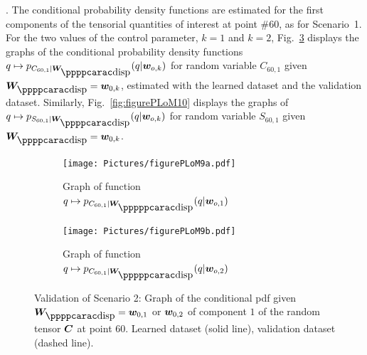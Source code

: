 .
%
The conditional probability density functions are estimated for the first components of the tensorial quantities of interest at point $\# 60$, as for Scenario~1.
%
For the two values of the control parameter, $k=1$ and $k=2$, Fig.~\ref{fig:figurePLoM9} displays the graphs of the conditional probability density functions $q\mapsto p_{ C_{60,1} \vert \bfW_\dispp } (q \vert \bfw_{o,k})$ for random variable $C_{60,1}$ given $\bfW_\dispp =\bfw_{0,k}$, estimated with the learned dataset and the validation dataset. Similarly, Fig.~\ref{fig:figurePLoM10} displays the graphs of $q\mapsto p_{ S_{60,1} \vert \bfW_\dispp } (q \vert \bfw_{o,k})$ for random variable $S_{60,1}$ given $\bfW_\dispp =\bfw_{0,k}$.
\begin{figure}[!htb]
    \begin{center}
        \begin{subfigure}[b]{0.45\textwidth}
            \begin{center}
                \texttt{[image: Pictures/figurePLoM9a.pdf]}
            \end{center}
                \caption{Graph of function $q\mapsto p_{ C_{60,1} \vert \bfW_\disppp } (q \vert \bfw_{o,1})$}
                \label{fig:figurePLoM9a}
            \end{subfigure}
            \begin{subfigure}[b]{0.45\textwidth}
                \begin{center}
                    \texttt{[image: Pictures/figurePLoM9b.pdf]}
                \end{center}
                \caption{Graph of function $q\mapsto p_{ C_{60,1} \vert \bfW_\disppp } (q \vert \bfw_{o,2})$}
                \label{fig:figurePLoM9b}
            \end{subfigure}
    \end{center}
    \caption[Validation of Scenario 2: Graph of the conditional pdf.]{Validation of Scenario 2: Graph of the conditional pdf given $\bfW_\dispp =\bfw_{0,1}$ or ${\boldsymbol{w}}_{0,2}$ of component $1$ of the random tensor ${\boldsymbol{C}}$ at point $60$. Learned dataset (solid line), validation dataset (dashed line).}
    \label{fig:figurePLoM9}
\end{figure}
%
